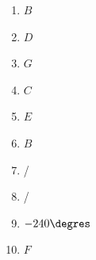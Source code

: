 %
%
  \begin{enumerate}[cols=5]
    \item $B$
    \item $D$
    \item $G$
    \item $C$
    \item $E$
    \item $B$
    \item /
    \item /
    \item $-240\degres$
    \item $F$
  \end{enumerate}
